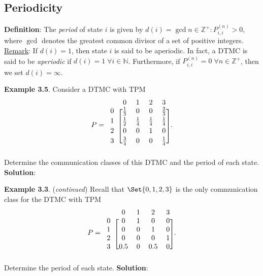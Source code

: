 \subsection*{Periodicity}
\begin{Regular}
    \textbf{Definition}: The \emph{period} of state $i$ is given by $d(i)=\gcd{n \in \mathbb{Z}^{+}: P_{i, i}^{(n)}>0}$,
    where $\gcd{}$ denotes the greatest common divisor of a set of positive integers.
    \tcblower{}
    \underline{Remark}: If $ d(i)=1 $, then state $ i $ is said to be aperiodic.
    In fact, a DTMC is said to be \emph{aperiodic} if $ d(i)=1\; \forall i\in \mathbb{N} $.
    Furthermore, if $ P_{i,i}^{(n)}=0\; \forall n \in \mathbb{Z}^{+} $, then we set $ d(i)=\infty $.
\end{Regular}
\begin{Example}
    \textbf{Example 3.5}. Consider a DTMC with TPM
    \[ P=\begin{blockarray}{cccccc}
            & 0 & 1 & 2 & 3 \\
            \begin{block}{c[ccccc]}
                0 & \frac{1}{3} & 0 & 0 & \frac{2}{3} \\[2pt]
                1 & \frac{1}{2} & \frac{1}{4} & \frac{1}{4} & \frac{1}{4} \\[2pt]
                2 & 0 & 0 & 1 & 0 \\[2pt]
                3 & \frac{3}{4} & 0 & 0 & \frac{1}{4}\\
            \end{block}
        \end{blockarray}. \]
    Determine the communication classes of this DTMC and the period of each state.
    \tcblower{}
    \textbf{Solution}:
\end{Example}
\begin{Example}
    \textbf{Example 3.3}. (\emph{continued})  Recall that $\Set{0, 1, 2, 3}$ is the
    only communication class for the DTMC with TPM
    \[ P=\begin{blockarray}{cccccc}
            & 0 & 1 & 2 & 3 \\
            \begin{block}{c[ccccc]}
                0 & 0 & 1 & 0 & 0 \\
                1 & 0 & 0 & 1 & 0 \\
                2 & 0 & 0 & 0 & 1 \\
                3 & 0.5 & 0 & 0.5 & 0\\
            \end{block}
        \end{blockarray}. \]
    Determine the period of each state.
    \tcblower{}
    \textbf{Solution}:
\end{Example}
